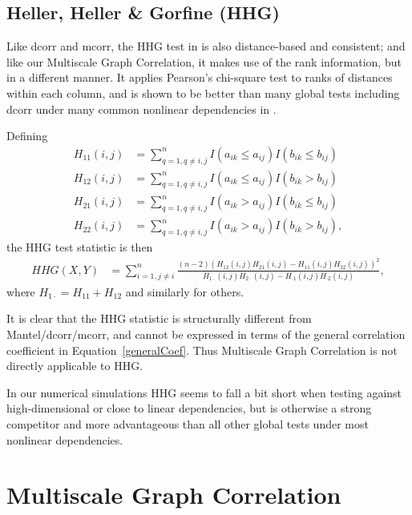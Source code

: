 \documentclass[11pt]{article}
\begin{document}
\subsection{Heller, Heller \& Gorfine (HHG)}
\label{sec:hhg}
Like dcorr and mcorr, the HHG test in \cite{HellerGorfine2013} is also distance-based and consistent; and like our Multiscale Graph Correlation, it makes use of the rank information, but in a different manner. It applies Pearson's chi-square test to ranks of distances within each column, and is shown to be better than many global tests including dcorr under many common nonlinear dependencies in \cite{GorfineHellerHeller2012, HellerGorfine2013}. 

Defining 
\begin{align*}
H_{11}(i,j) &= \sum_{q=1,q\neq i,j}^{n}I(a_{ik} \leq a_{ij})I(b_{ik} \leq b_{ij}) \\
H_{12}(i,j) &= \sum_{q=1,q\neq i,j}^{n}I(a_{ik} \leq a_{ij})I(b_{ik} > b_{ij}) \\
H_{21}(i,j) &= \sum_{q=1,q\neq i,j}^{n}I(a_{ik} > a_{ij})I(b_{ik} \leq b_{ij}) \\
H_{22}(i,j) &= \sum_{q=1,q\neq i,j}^{n}I(a_{ik} > a_{ij})I(b_{ik} > b_{ij}),
\end{align*}
the HHG test statistic is then
\begin{align*}
HHG(X,Y) &= \sum_{i=1,j\neq i}^{n} \frac{(n-2)(H_{12}(i,j)H_{21}(i,j)-H_{11}(i,j)H_{22}(i,j))^2}{H_{1 \cdot}(i,j)H_{2 \cdot}(i,j)-H_{\cdot 1}(i,j)H_{\cdot 2}(i,j)},
\end{align*}
where $H_{1 \cdot}=H_{11}+H_{12}$ and similarly for others.

It is clear that the HHG statistic is structurally different from Mantel/dcorr/mcorr, and cannot be expressed in terms of the general correlation coefficient in Equation~\ref{generalCoef}. Thus Multiscale Graph Correlation is not directly applicable to HHG.

In our numerical simulations HHG seems to fall a bit short when testing against high-dimensional or close to linear dependencies, but is otherwise a strong competitor and more advantageous than all other global tests under most nonlinear dependencies. %

\section{Multiscale Graph Correlation}
\label{main2}
\end{document}
